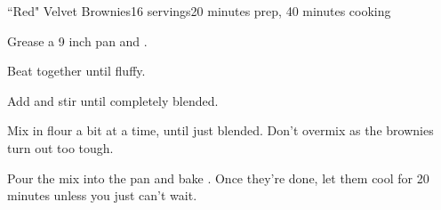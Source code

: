 \documentclass[../Cookbook.tex]{subfiles}
\begin{document}
\begin{recipe}{``Red" Velvet Brownies}{16 servings}{20 minutes prep, 40 minutes cooking}

Grease a 9 inch pan and .

Beat together until fluffy.

Add and stir until completely blended.

Mix in flour a bit at a time, until just blended. Don't overmix as the brownies turn out too tough.

\newstep
Pour the mix into the pan and bake . Once they're done, let them cool for 20 minutes unless you just can't wait.

\end{recipe}
\end{document}
